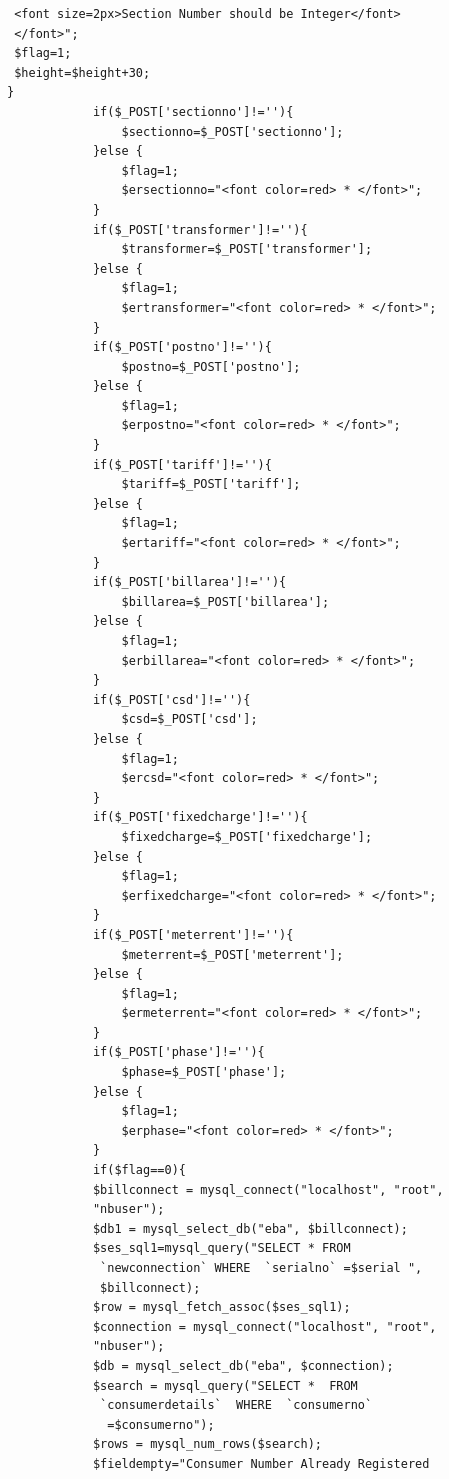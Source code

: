 \documentclass[12pt,a4paper,oneside]{report}
\begin{document}
\begin{lstlisting}
 <font size=2px>Section Number should be Integer</font>
 </font>";
 $flag=1;
 $height=$height+30;
}
            if($_POST['sectionno']!=''){
                $sectionno=$_POST['sectionno'];
            }else {
                $flag=1;
                $ersectionno="<font color=red> * </font>";
            }
            if($_POST['transformer']!=''){
                $transformer=$_POST['transformer'];
            }else {
                $flag=1;
                $ertransformer="<font color=red> * </font>";
            }
            if($_POST['postno']!=''){
                $postno=$_POST['postno'];
            }else {
                $flag=1;
                $erpostno="<font color=red> * </font>";
            }
            if($_POST['tariff']!=''){
                $tariff=$_POST['tariff'];
            }else {
                $flag=1;
                $ertariff="<font color=red> * </font>";
            }
            if($_POST['billarea']!=''){
                $billarea=$_POST['billarea'];
            }else {
                $flag=1;
                $erbillarea="<font color=red> * </font>";
            }
            if($_POST['csd']!=''){
                $csd=$_POST['csd'];
            }else {
                $flag=1;
                $ercsd="<font color=red> * </font>";
            }
            if($_POST['fixedcharge']!=''){
                $fixedcharge=$_POST['fixedcharge'];
            }else {
                $flag=1;
                $erfixedcharge="<font color=red> * </font>";
            }
            if($_POST['meterrent']!=''){
                $meterrent=$_POST['meterrent'];
            }else {
                $flag=1;
                $ermeterrent="<font color=red> * </font>";
            }
            if($_POST['phase']!=''){
                $phase=$_POST['phase'];
            }else {
                $flag=1;
                $erphase="<font color=red> * </font>";
            }
            if($flag==0){
            $billconnect = mysql_connect("localhost", "root", 
            "nbuser");
            $db1 = mysql_select_db("eba", $billconnect);
            $ses_sql1=mysql_query("SELECT * FROM 
             `newconnection` WHERE  `serialno` =$serial ", 
             $billconnect);
            $row = mysql_fetch_assoc($ses_sql1);
            $connection = mysql_connect("localhost", "root", 
            "nbuser");
            $db = mysql_select_db("eba", $connection);
            $search = mysql_query("SELECT *  FROM 
             `consumerdetails`  WHERE  `consumerno`
              =$consumerno");
            $rows = mysql_num_rows($search);
            $fieldempty="Consumer Number Already Registered 

\end{lstlisting}
\end{document}
